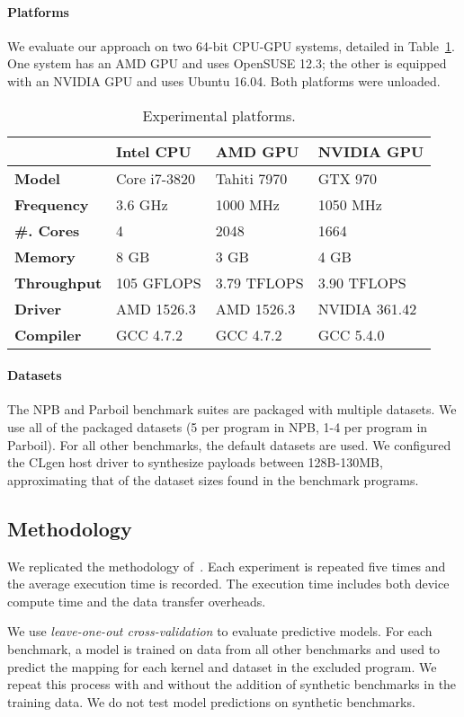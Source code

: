 \paragraph{Platforms} We evaluate our approach on two 64-bit CPU-GPU systems, detailed in Table~\ref{tab:platforms}. One system has an AMD GPU and uses OpenSUSE 12.3; the other is equipped with an NVIDIA GPU and uses Ubuntu 16.04. Both platforms were unloaded.

\begin{table}%
  \centering %
  \begin{tabular}{l l l l}
    \toprule
    & \textbf{Intel CPU} & \textbf{AMD GPU} & \textbf{NVIDIA GPU} \\
    \midrule
    \textbf{Model} & Core i7-3820 & Tahiti 7970 & GTX 970 \\
    \textbf{Frequency} & 3.6 GHz & 1000 MHz & 1050 MHz \\
    \textbf{\#. Cores} & 4 & 2048 & 1664 \\
    \textbf{Memory} & 8 GB & 3 GB & 4 GB \\
    \textbf{Throughput} & 105 GFLOPS & 3.79 TFLOPS & 3.90 TFLOPS \\
    \textbf{Driver} & AMD 1526.3 & AMD 1526.3 & NVIDIA 361.42 \\
    \textbf{Compiler} & GCC 4.7.2 & GCC 4.7.2 & GCC 5.4.0 \\
  \end{tabular}
  \caption{Experimental platforms.}
  \label{tab:platforms}
\end{table}

\paragraph{Datasets} The NPB and Parboil benchmark suites are packaged with multiple datasets. We use all of the packaged datasets (5 per program in NPB, 1-4 per program in Parboil). For all other benchmarks, the default datasets are used. We configured the CLgen host driver to synthesize payloads between 128B-130MB, approximating that of the dataset sizes found in the benchmark programs.

\subsection{Methodology}

We replicated the methodology of~\cite{Grewe2013}. Each experiment is repeated five times and the average execution time is recorded. The execution time includes both device compute time and the data transfer overheads.

We use \emph{leave-one-out cross-validation} to evaluate predictive models. For each benchmark, a model is trained on data from all other benchmarks and used to predict the mapping for each kernel and dataset in the excluded program. We repeat this process with and without the addition of synthetic benchmarks in the training data. We do not test model predictions on synthetic benchmarks.
